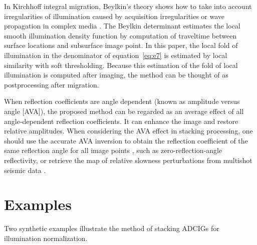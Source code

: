 
In Kirchhoff integral migration, Beylkin’s theory \cite[]{Beylkin} shows how to take into account irregularities of illumination caused by acquisition irregularities or wave propagation in complex media \cite[]{Audebert}. The Beylkin determinant estimates the local smooth illumination density function by computation of traveltime between surface locations and subsurface image point. In this paper, the local fold of illumination in the denominator of equation~\ref{eq:e7} is estimated by local similarity with soft thresholding. Because this estimation of the fold of local illumination is computed after imaging, the method can be thought of as postprocessing after migration. 



When reflection coefficients are angle dependent (known as amplitude versus angle [AVA]), the proposed method can be regarded as an average effect of all angle-dependent reflection coefficients. It can enhance the image and restore relative amplitudes. When considering the AVA effect in stacking processing, one should use the accurate AVA inversion to obtain the reflection coefficient of the same reflection angle for all image points \cite[]{Kuhl}, such as zero-reflection-angle reflectivity, or retrieve the map of relative slowness perturbations from multishot seismic data \cite[]{Kiyashchenko}.

\section{Examples}

Two synthetic examples illustrate the method of stacking ADCIGs for illumination normalization.


